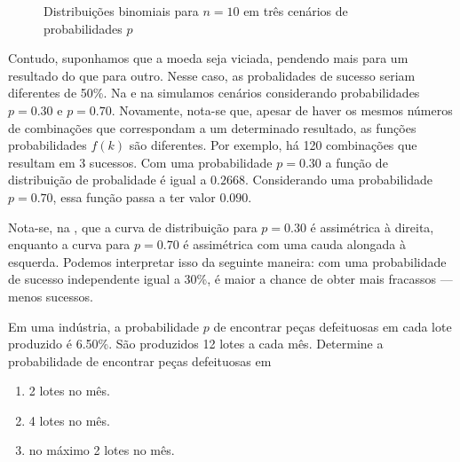 \begin{figure}[htpb]
    \centering
    \resizebox{\textwidth}{!}{}
    \caption{Distribuições binomiais para $n=10$ em três cenários de
    probabilidades $p$}
    \label{fig:dez-lancamentos}
\end{figure}

Contudo, suponhamos que a moeda seja viciada, pendendo mais para um resultado
do que para outro. Nesse caso, as probalidades de sucesso seriam diferentes de
50\%.  Na  e na  simulamos
cenários considerando probabilidades $p=0.30$ e $p=0.70$. Novamente, nota-se
que, apesar de haver os mesmos números de combinações que correspondam a um
determinado resultado, as funções probabilidades $f(k)$ são diferentes.
Por exemplo, há 120 combinações que resultam em 3 sucessos. Com uma
probabilidade $p=0.30$ a função de distribuição de probalidade é igual a
$0.2668$. Considerando uma probabilidade $p=0.70$, essa função passa a ter
valor $0.090$.

Nota-se, na , que a curva de distribuição para
$p=0.30$ é assimétrica à direita, enquanto a curva para $p=0.70$ é assimétrica
com uma cauda alongada à esquerda. Podemos interpretar isso da seguinte
maneira: com uma probabilidade de sucesso independente igual a 30\%, é maior a
chance de obter mais fracassos --- menos sucessos.

\begin{eg}
Em uma indústria, a probabilidade $p$ de encontrar peças defeituosas em
cada lote produzido é 6.50\%. São produzidos 12 lotes a cada mês.
Determine a probabilidade de encontrar peças defeituosas em
\begin{enumerate}[label=\alph*)]
    \item 2 lotes no mês.
    \item 4 lotes no mês.
    \item no máximo 2 lotes no mês.
\end{enumerate}
\label{eg:pecas-defeituosas}
\end{eg}

